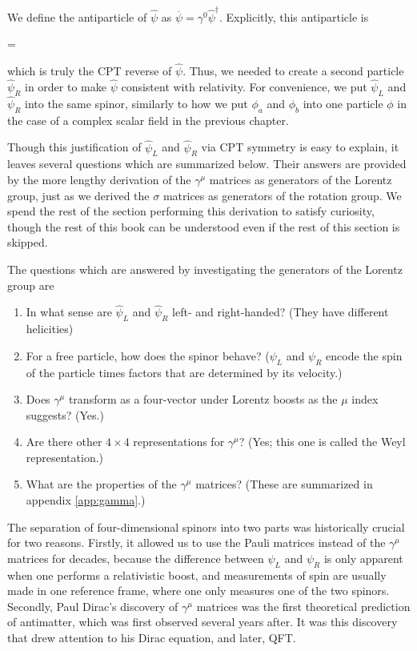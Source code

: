 We define the antiparticle of $\hat \psi$ as $\overline \psi = \gamma^0 \hat \psi^\dagger$. Explicitly, this antiparticle is
\begin{e}
  \overline \psi = 
\end{e}
which is truly the CPT reverse of $\hat \psi$. Thus, we needed to create a second particle $\hat \psi_R$ in order to make $\hat \psi$ consistent with relativity. For convenience, we put $\hat \psi_L$ and $\hat \psi_R$ into the same spinor, similarly to how we put $\phi_a$ and $\phi_b$ into one particle $\phi$ in the case of a complex scalar field in the previous chapter.

Though this justification of $\hat \psi_L$ and $\hat \psi_R$ via CPT symmetry is easy to explain, it leaves several questions which are summarized below. Their answers are provided by the more lengthy derivation of the $\gamma^\mu$ matrices as generators of the Lorentz group, just as we derived the $\sigma$ matrices as generators of the rotation group. We spend the rest of the section performing this derivation to satisfy curiosity, though the rest of this book can be understood even if the rest of this section is skipped.

The questions which are answered by investigating the generators of the Lorentz group are
\begin{enumerate}
  \item In what sense are $\hat\psi_L$ and $\hat\psi_R$ left- and right-handed? (They have different helicities)
  \item For a free particle, how does the spinor behave? ($\psi_L$ and $\psi_R$ encode the spin of the particle times factors that are determined by its velocity.)
  \item Does $\gamma^\mu$ transform as a four-vector under Lorentz boosts as the $\mu$ index suggests? (Yes.)
  \item Are there other $4\times 4$ representations for $\gamma^\mu$? (Yes; this one is called the Weyl representation.)
  \item What are the properties of the $\gamma^\mu$ matrices? (These are summarized in appendix \ref{app:gamma}.)
\end{enumerate}

The separation of four-dimensional spinors into two parts was historically crucial for two reasons. Firstly, it allowed us to use the Pauli matrices instead of the $\gamma^\mu$ matrices for decades, because the difference between $\psi_L$ and $\psi_R$ is only apparent when one performs a relativistic boost, and measurements of spin are usually made in one reference frame, where one only measures one of the two spinors. Secondly, Paul Dirac's discovery of $\gamma^\mu$ matrices was the first theoretical prediction of antimatter, which was first observed several years after. It was this discovery that drew attention to his Dirac equation, and later, QFT.

